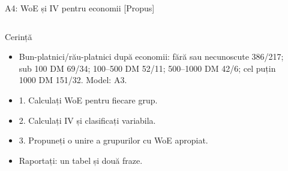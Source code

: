 \begin{frame}{A4: WoE și IV pentru economii [Propus]}
\propsub
\itemsize{\scriptsize}
\begin{columns}[T]
\begin{column}{\taskw}
\begin{block}{Cerință}
\begin{itemize}
    \item Bun-platnici/rău-platnici după economii: fără sau necunoscute 386/217; sub 100 DM 69/34; 100--500 DM 52/11; 500--1000 DM 42/6; cel puțin 1000 DM 151/32. Model: A3.
    \item 1. Calculați WoE pentru fiecare grup.
    \item 2. Calculați IV și clasificați variabila.
    \item 3. Propuneți o unire a grupurilor cu WoE apropiat.
    \item Raportați: un tabel și două fraze.
\end{itemize}
\end{block}
\end{column}
\begin{column}{\solw}
\end{column}
\end{columns}
\end{frame}

